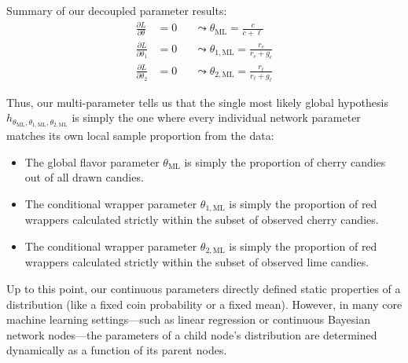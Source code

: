 Summary of our decoupled parameter results:
\begin{align*}
\frac{\partial L}{\partial \theta} &= 0 &&\leadsto \theta_{\text{ML}} = \frac{c}{c + \ell} \\
\frac{\partial L}{\partial \theta_1} &= 0 &&\leadsto \theta_{1,\text{ML}} = \frac{r_c}{r_c + g_c} \\
\frac{\partial L}{\partial \theta_2} &= 0 &&\leadsto \theta_{2,\text{ML}} = \frac{r_{\ell}}{r_{\ell} + g_{\ell}}
\end{align*}

Thus, our multi-parameter  tells us that the single most likely global hypothesis $h_{\theta_{\text{ML}}, \theta_{1,\text{ML}}, \theta_{2,\text{ML}}}$ is simply the one where every individual network parameter matches its own local sample proportion from the data:
\begin{itemize}
    \item The global flavor parameter $\theta_{\text{ML}}$ is simply the proportion of cherry candies out of all drawn candies.
    \item The conditional wrapper parameter $\theta_{1,\text{ML}}$ is simply the proportion of red wrappers calculated strictly within the subset of observed cherry candies.
    \item The conditional wrapper parameter $\theta_{2,\text{ML}}$ is simply the proportion of red wrappers calculated strictly within the subset of observed lime candies.
\end{itemize}


Up to this point, our continuous parameters directly defined static properties of a distribution (like a fixed coin probability or a fixed mean). However, in many core machine learning settings—such as linear regression or continuous Bayesian network nodes—the parameters of a child node's distribution are determined dynamically as a function of its parent nodes.



